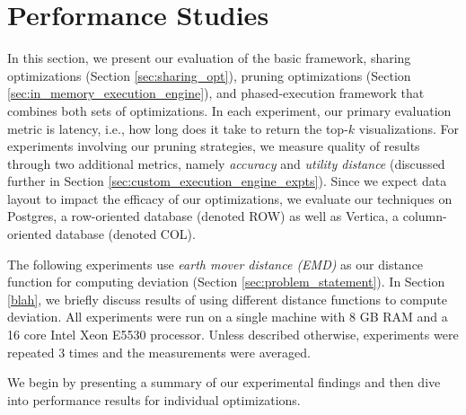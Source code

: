 \section{Performance Studies}
\label{sec:experiments}

In this section, we present our evaluation of the basic \SeeDB framework, sharing optimizations 
(Section \ref{sec:sharing_opt}), pruning optimizations (Section \ref{sec:in_memory_execution_engine}), 
and phased-execution framework that combines both sets of optimizations.
In each experiment, our primary evaluation metric is latency, i.e., 
how long does it take \SeeDB to return the top-$k$ visualizations. 
For experiments involving our pruning strategies, we measure quality of results through two additional
metrics, namely {\it accuracy} and {\it utility distance} (discussed further in Section 
\ref{sec:custom_execution_engine_expts}).
Since we expect data layout to impact the efficacy of our optimizations, we 
evaluate our techniques on Postgres, a row-oriented database (denoted ROW) as well as Vertica, 
a column-oriented database (denoted COL).

The following experiments use {\it earth mover distance (EMD)} as our distance function for
computing deviation (Section \ref{sec:problem_statement}).
In Section \ref{blah}, we briefly discuss results of using different distance functions to
compute deviation.
All experiments were run on a single machine with 8 GB RAM and a 16 core Intel 
Xeon E5530 processor. 
Unless described otherwise, experiments were repeated 3 times and the measurements 
were averaged.

We begin by presenting a summary of our experimental findings and then dive into performance results 
for individual optimizations.












